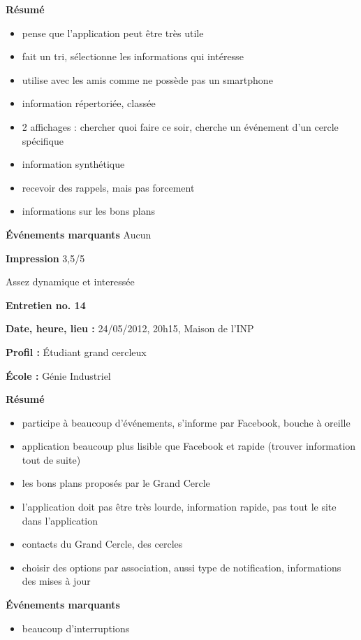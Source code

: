 \documentclass[a4paper, 11px]{article}
\begin{document}
\textbf{Résumé}
	\begin{itemize}
		\item pense que l'application peut être très utile
		\item fait un tri, sélectionne les informations qui intéresse
		\item utilise avec les amis comme ne possède pas un smartphone
		\item information répertoriée, classée
		\item 2 affichages : chercher quoi faire ce soir, cherche un événement d'un cercle spécifique
		\item information synthétique
		\item recevoir des rappels, mais pas forcement
		\item informations sur les bons plans
	\end{itemize}

\textbf{Événements marquants}
Aucun

\textbf{Impression}
3,5/5

Assez dynamique et interessée




\vspace{.3cm}

 \textbf {\large Entretien no. 14}

\textbf{Date, heure, lieu : }
24/05/2012, 20h15, Maison de l'INP

\textbf{Profil : }
Étudiant grand cercleux

\textbf{École : }
Génie Industriel

\textbf{Résumé}
	\begin{itemize}
		\item participe à beaucoup d'événements, s'informe par Facebook, bouche à oreille
		\item application beaucoup plus lisible que Facebook et rapide (trouver information tout de suite)
		\item les bons plans proposés par le Grand Cercle
		\item l'application doit pas être très lourde, information rapide, pas tout le site dans l'application
		\item contacts du Grand Cercle, des cercles
		\item choisir des options par association, aussi type de notification, informations des mises à jour
	\end{itemize}

\textbf{Événements marquants}
	\begin{itemize}
		\item beaucoup d'interruptions
	\end{itemize}
\end{document}
